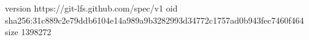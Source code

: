 version https://git-lfs.github.com/spec/v1
oid sha256:31c889c2e79ddb6104e14a989a9b3282993d34772c1757ad0b943fec7460f464
size 1398272
